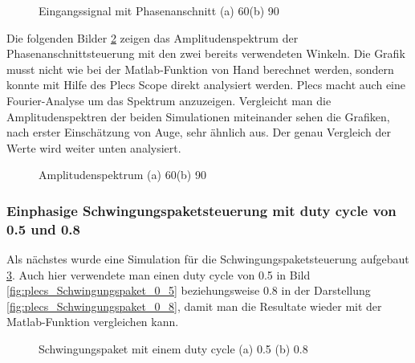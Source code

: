 \begin{figure}[ht!]
	\centering
	\qquad
	\caption{Eingangssignal mit Phasenanschnitt (a) 60\textdegree (b) 90\textdegree}
	\label{fig:Eingangssignal simuliert mit Plecs}
\end{figure}

\newpage

Die folgenden Bilder \ref{fig:plecs_Amplitudenspektrum} zeigen das Amplitudenspektrum der Phasenanschnittsteuerung mit den zwei bereits verwendeten Winkeln. Die Grafik musst nicht wie bei der Matlab-Funktion von Hand berechnet werden, sondern konnte mit Hilfe des Plecs Scope direkt analysiert werden. Plecs macht auch eine Fourier-Analyse um das Spektrum anzuzeigen. Vergleicht man die Amplitudenspektren der beiden Simulationen miteinander sehen die Grafiken, nach erster Einschätzung von Auge, sehr ähnlich aus. Der genau Vergleich der Werte wird weiter unten analysiert.   
     
\begin{figure}[ht!]
	\centering
	\qquad
	\caption{Amplitudenspektrum (a) 60\textdegree (b) 90\textdegree}
	\label{fig:plecs_Amplitudenspektrum}
\end{figure}

\subsubsection{Einphasige Schwingungspaketsteuerung mit duty cycle von 0.5 und 0.8}

Als nächstes wurde eine Simulation für die Schwingungspaketsteuerung aufgebaut \ref{fig:plecs_Schwingungspakete}. Auch hier verwendete man einen duty cycle von 0.5 in Bild  \ref{fig:plecs_Schwingungspaket_0_5} beziehungsweise 0.8 in der Darstellung \ref{fig:plecs_Schwingungspaket_0_8}, damit man die Resultate wieder mit der Matlab-Funktion vergleichen kann.  
\begin{figure}[ht!]
	\centering
	\qquad
	\caption{Schwingungspaket mit einem duty cycle (a) 0.5 (b) 0.8}
	\label{fig:plecs_Schwingungspakete}
\end{figure}

